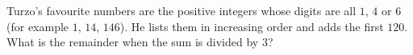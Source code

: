Turzo's favourite numbers are the positive integers whose digits are all $1$, $4$ or $6$ (for example $1$, $14$, $146$). He lists them in increasing order and adds the first $120$. What is the remainder when the sum is divided by $3$?
